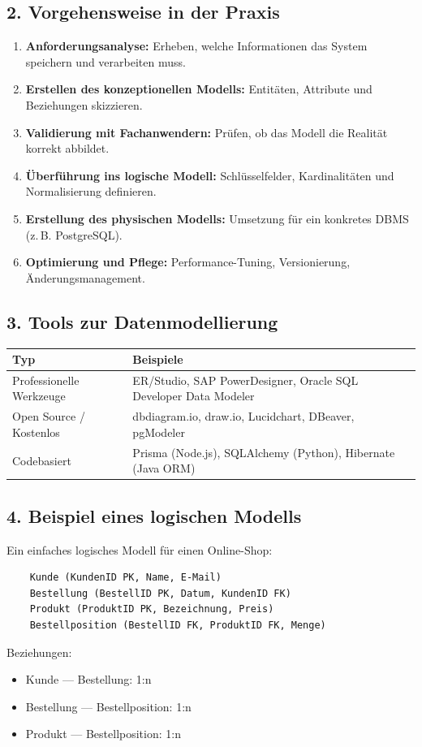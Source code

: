 \subsection*{2. Vorgehensweise in der Praxis}
\begin{enumerate}[label=\arabic*.]
	\item \textbf{Anforderungsanalyse:} Erheben, welche Informationen das System speichern und verarbeiten muss.
	\item \textbf{Erstellen des konzeptionellen Modells:} Entitäten, Attribute und Beziehungen skizzieren.
	\item \textbf{Validierung mit Fachanwendern:} Prüfen, ob das Modell die Realität korrekt abbildet.
	\item \textbf{Überführung ins logische Modell:} Schlüsselfelder, Kardinalitäten und Normalisierung definieren.
	\item \textbf{Erstellung des physischen Modells:} Umsetzung für ein konkretes DBMS (z.\,B. PostgreSQL).
	\item \textbf{Optimierung und Pflege:} Performance-Tuning, Versionierung, Änderungsmanagement.
\end{enumerate}

\subsection*{3. Tools zur Datenmodellierung}
\begin{tabular}{@{}p{4cm}p{10cm}@{}}
	\toprule
	\textbf{Typ} & \textbf{Beispiele} \\ \midrule
	Professionelle Werkzeuge & ER/Studio, SAP PowerDesigner, Oracle SQL Developer Data Modeler \\
	Open Source / Kostenlos & dbdiagram.io, draw.io, Lucidchart, DBeaver, pgModeler \\
	Codebasiert & Prisma (Node.js), SQLAlchemy (Python), Hibernate (Java ORM) \\
	\bottomrule
\end{tabular}

\subsection*{4. Beispiel eines logischen Modells}
Ein einfaches logisches Modell für einen Online-Shop:
\begin{verbatim}
	Kunde (KundenID PK, Name, E-Mail)
	Bestellung (BestellID PK, Datum, KundenID FK)
	Produkt (ProduktID PK, Bezeichnung, Preis)
	Bestellposition (BestellID FK, ProduktID FK, Menge)
\end{verbatim}

\noindent Beziehungen:
\begin{itemize}
	\item Kunde — Bestellung: 1:n
	\item Bestellung — Bestellposition: 1:n
	\item Produkt — Bestellposition: 1:n
\end{itemize}